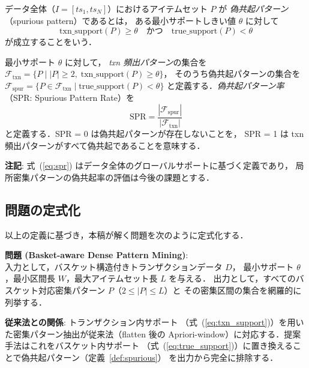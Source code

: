 \begin{definition}[偽共起パターン]
\label{def:spurious}
データ全体（$I = [ts_1, ts_N]$）におけるアイテムセット $P$ が
\emph{偽共起パターン}（spurious pattern）であるとは，
ある最小サポートしきい値 $\theta$ に対して
\begin{equation}
\text{txn\_support}(P) \geq \theta \quad \text{かつ} \quad
\text{true\_support}(P) < \theta
\end{equation}
が成立することをいう．
\end{definition}

\begin{definition}
\label{def:spr}
最小サポート $\theta$ に対して，
\emph{txn 頻出パターン}の集合を
$\mathcal{F}_{\text{txn}} = \{P \mid |P| \geq 2,\; \text{txn\_support}(P) \geq \theta\}$，
そのうち偽共起パターンの集合を
$\mathcal{F}_{\text{spur}} = \{P \in \mathcal{F}_{\text{txn}} \mid \text{true\_support}(P) < \theta\}$
と定義する．\emph{偽共起パターン率}（SPR: Spurious Pattern Rate）を
\begin{equation}
\text{SPR} = \frac{|\mathcal{F}_{\text{spur}}|}{|\mathcal{F}_{\text{txn}}|}
\label{eq:spr}
\end{equation}
と定義する．SPR = 0 は偽共起パターンが存在しないことを，
SPR = 1 は txn 頻出パターンがすべて偽共起であることを意味する．
\end{definition}

\noindent
\textbf{注記}: 式~(\ref{eq:spr}) はデータ全体のグローバルサポートに基づく定義であり，
局所密集パターンの偽共起率の評価は今後の課題とする．

\subsection{問題の定式化}

以上の定義に基づき，本稿が解く問題を次のように定式化する．

\medskip
\noindent
\textbf{問題 (Basket-aware Dense Pattern Mining)}: \\
入力として，バスケット構造付きトランザクションデータ $D$，
最小サポート $\theta$，最小区間長 $W$，最大アイテムセット長 $L$ を与える．
出力として，すべてのバスケット対応密集パターン $P$（$2 \leq |P| \leq L$）と
その密集区間の集合を網羅的に列挙する．
\medskip

\noindent
\textbf{従来法との関係}: トランザクション内サポート
（式~(\ref{eq:txn_support})）を用いた密集パターン抽出が従来法（flatten 後の
Apriori-window）に対応する．提案手法はこれをバスケット内サポート
（式~(\ref{eq:true_support})）に置き換えることで偽共起パターン（定義~\ref{def:spurious}）
を出力から完全に排除する．

